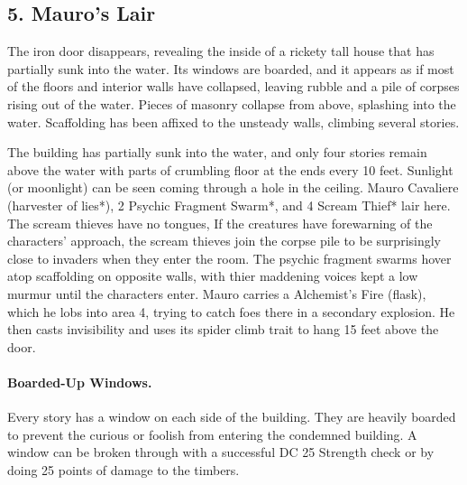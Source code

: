 \documentclass[10pt,a4paper,twoside,twocolumn,openany,bg=print,nodeprecatedcode]{dndbook}
\begin{document}
\subsection{5. Mauro's Lair}
\begin{DndReadAloud}{}
The iron door disappears, revealing the inside of a rickety tall house that has partially sunk into the water. Its windows are boarded, and it appears as if most of the floors and interior walls have collapsed, leaving rubble and a pile of corpses rising out of the water. Pieces of masonry collapse from above, splashing into the water. Scaffolding has been affixed to the unsteady walls, climbing several stories.
\end{DndReadAloud}

The building has partially sunk into the water, and only four stories remain above the water with parts of crumbling floor at the ends every 10 feet. Sunlight (or moonlight) can be seen coming through a hole in the ceiling. Mauro Cavaliere (harvester of lies*), 2 Psychic Fragment Swarm*, and 4 Scream Thief* lair here. The scream thieves have no tongues,
If the creatures have forewarning of the characters' approach, the scream thieves join the corpse pile to be surprisingly close to invaders when they enter the room. The psychic fragment swarms hover atop scaffolding on opposite walls, with thier maddening voices kept a low murmur until the characters enter. Mauro carries a Alchemist's Fire (flask), which he lobs into area 4, trying to catch foes there in a secondary explosion. He then casts invisibility and uses its spider climb trait to hang 15 feet above the door.
\paragraph{Boarded-Up Windows.}
Every story has a window on each side of the building. They are heavily boarded to prevent the curious or foolish from entering the condemned building. A window can be broken through with a successful DC 25 Strength check or by doing 25 points of damage to the timbers.
\end{document}
